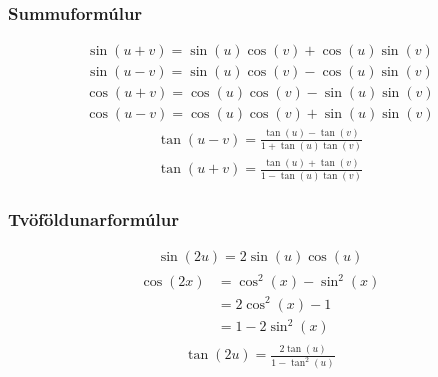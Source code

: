 \documentclass[a4paper,10pt,icelandic]{sphinxmanual}
\begin{document}
\subsubsection{Summuformúlur}
\label{\detokenize{Kafli12:summuformulur}}
\begin{equation*}
\begin{split}\sin( u + v ) = \sin(u)  \cos(v) + \cos(u) \sin(v)\end{split}
\end{equation*}
\begin{equation*}
\begin{split}\sin( u - v ) = \sin(u) \cos(v) - \cos(u) \sin(v)\end{split}
\end{equation*}
\begin{equation*}
\begin{split}\cos( u + v ) = \cos(u)  \cos(v) - \sin(u)  \sin(v)\end{split}
\end{equation*}
\begin{equation*}
\begin{split}\cos( u - v ) = \cos(u)  \cos(v) + \sin(u)  \sin(v)\end{split}
\end{equation*}
\begin{equation*}
\begin{split}\tan(u-v) = \frac{\tan(u) - \tan(v)}{1 + \tan(u)  \tan(v)}\end{split}
\end{equation*}
\begin{equation*}
\begin{split}\tan(u+v) = \frac{\tan(u) + \tan(v)}{1 - \tan(u)  \tan(v)}\end{split}
\end{equation*}

\subsubsection{Tvöföldunarformúlur}
\label{\detokenize{Kafli12:tvofoldunarformulur}}
\begin{equation*}
\begin{split}\sin(2u) = 2\sin(u)\cos(u)\end{split}
\end{equation*}
\begin{equation*}
\begin{split}\begin{aligned}
\cos(2x)&= \cos^2(x)-\sin^2(x) \\
&= 2\cos^2(x)-1 \\
&= 1-2 \sin^2(x)
\end{aligned}\end{split}
\end{equation*}
\begin{equation*}
\begin{split}\tan(2u) = \frac{2\tan(u)}{1-\tan^2(u)}\end{split}
\end{equation*}
\end{document}
